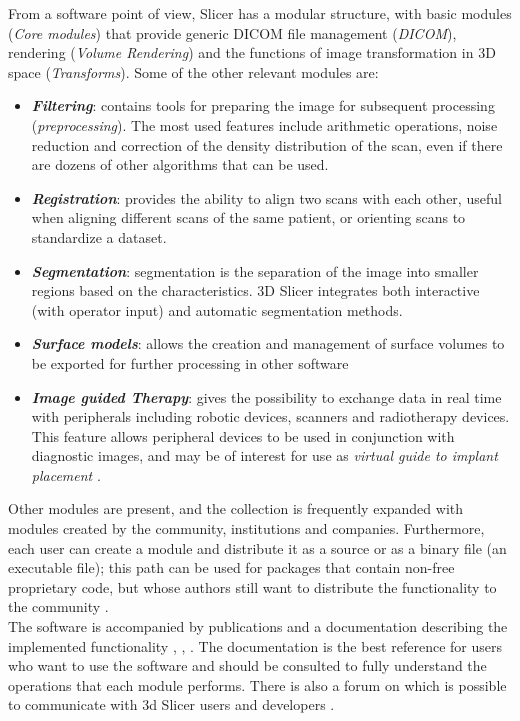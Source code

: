 From a software point of view, Slicer has a modular structure, with basic modules (\emph{Core modules}) that provide generic DICOM file management (\emph{DICOM}), rendering (\emph{Volume Rendering}) and the functions of image transformation in 3D space (\emph{Transforms}). Some of the other relevant modules are:
\begin{itemize}
\item \emph{\textbf{Filtering}}: contains tools for preparing the image for subsequent processing (\emph{preprocessing}). The most used features include arithmetic operations, noise reduction and correction of the density distribution of the scan, even if there are dozens of other algorithms that can be used.
\item \emph{\textbf{Registration}}: provides the ability to align two scans with each other, useful when aligning different scans of the same patient, or orienting scans to standardize a dataset.
\item \emph{\textbf{Segmentation}}: segmentation is the separation of the image into smaller regions based on the characteristics. 3D Slicer integrates both interactive (with operator input) and automatic segmentation methods.
\item \emph{\textbf{Surface models}}: allows the creation and management of surface volumes to be exported for further processing in other software
\item \emph{\textbf{Image guided Therapy}}: gives the possibility to exchange data in real time with peripherals including robotic devices, scanners and radiotherapy devices.
This feature allows peripheral devices to be used in conjunction with diagnostic images, and may be of interest for use as \emph{virtual guide to implant placement} \parencite{Reference118}.
\end{itemize}

Other modules are present, and the collection is frequently expanded with modules created by the community, institutions and companies. Furthermore, each user can create a module and distribute it as a source or as a binary file (an executable file); this path can be used for packages that contain non-free proprietary code, but whose authors still want to distribute the functionality to the community \parencite{Reference28}. \\
The software is accompanied by publications and a documentation describing the implemented functionality \parencite{Reference28}, \parencite{Reference29}, \parencite{Reference30}. The documentation is the best reference for users who want to use the software and should be consulted to fully understand the operations that each module performs. There is also a forum on which is possible to communicate with 3d Slicer users and developers \parencite{Reference35}.

